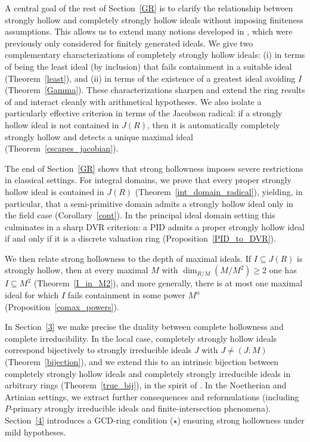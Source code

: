 \documentclass[11pt,english]{amsart}
\theoremstyle{definition}
\numberwithin{equation}{section}
\theoremstyle{remark}
\begin{document}
A central goal of the rest of Section~\ref{GR} is to clarify the relationship between strongly hollow and completely strongly hollow ideals
without imposing finiteness assumptions. This allows us to extend many notions developed in \cite{Rostami2021}, which were previously only considered for finitely generated ideals.
We give two complementary characterizations of completely strongly hollow ideals:
(i) in terms of being the least ideal (by inclusion) that fails containment in a suitable ideal (Theorem~\ref{least}),
and (ii) in terms of the existence of a greatest ideal avoiding $I$ (Theorem~\ref{Gamma}).
These characterizations sharpen and extend the ring results of \cite{Rostami2021} and interact cleanly with arithmetical hypotheses.
We also isolate a particularly effective criterion in terms of the Jacobson radical:
if a strongly hollow ideal is not contained in $J(R)$, then it is automatically completely strongly hollow and detects a unique maximal ideal
(Theorem~\ref{escapes_jacobian}).

The end of Section~\ref{GR} shows that strong hollowness imposes severe restrictions in classical settings.
For integral domains, we prove that every proper strongly hollow ideal is contained in $J(R)$ (Theorem~\ref{int_domain_radical}),
yielding, in particular, that a semi-primitive domain admits a strongly hollow ideal only in the field case (Corollary~\ref{cont}).
In the principal ideal domain setting this culminates in a sharp DVR criterion:
a PID admits a proper strongly hollow ideal if and only if it is a discrete valuation ring (Proposition~\ref{PID_to_DVR}).

We then relate strong hollowness to the depth of maximal ideals.
If $I\subseteq J(R)$ is strongly hollow, then at every maximal $M$ with $\dim_{R/M}(M/M^2)\ge 2$ one has $I\subseteq M^2$
(Theorem~\ref{I_in_M2}),
and more generally, there is at most one maximal ideal for which $I$ fails containment in some power $M^n$
(Proposition~\ref{comax_powers}).

In Section~\ref{3} we make precise the duality between complete hollowness and complete irreducibility.
In the local case, completely strongly hollow ideals correspond bijectively to strongly irreducible ideals $J$ with $J\neq (J:M)$
(Theorem~\ref{bijection}), and we extend this to an intrinsic bijection between completely strongly hollow ideals and completely strongly
irreducible ideals in arbitrary rings (Theorem~\ref{true_bij}), in the spirit of \cite{FHO,HRR2002}.
In the Noetherian and Artinian settings, we extract further consequences and reformulations (including $P$-primary strongly irreducible ideals and
finite-intersection phenomena).
Section~\ref{4} introduces a GCD-ring condition ($\star$) ensuring strong hollowness under mild hypotheses.
\end{document}
